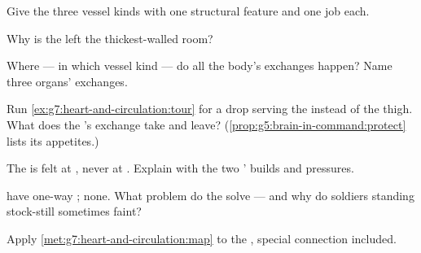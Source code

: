 \begin{exercise}[$\star$]\label{exo:g7:heart-and-circulation:4}
Give the three vessel kinds with one structural feature
and one job each.
\end{exercise}

\begin{exercise}[$\star$]\label{exo:g7:heart-and-circulation:5}
Why is the left  the thickest-walled room?
\end{exercise}

\begin{exercise}[$\star$]\label{exo:g7:heart-and-circulation:6}
Where --- in which vessel kind --- do all the body's
exchanges happen? Name three organs' 
exchanges.
\end{exercise}

\begin{exercise}[$\star\star$]\label{exo:g7:heart-and-circulation:7}
Run \cref{ex:g7:heart-and-circulation:tour} for a drop
serving the  instead of the thigh. What does the
's  exchange take and leave?
(\cref{prop:g5:brain-in-command:protect} lists its
appetites.)
\end{exercise}

\begin{exercise}[$\star\star$]\label{exo:g7:heart-and-circulation:8}
The  is felt at , never at . Explain
with the two ' builds and pressures.
\end{exercise}

\begin{exercise}[$\star\star$]\label{exo:g7:heart-and-circulation:9}
 have one-way ;  none. What problem
do the   solve --- and why do soldiers
standing stock-still sometimes faint?
\end{exercise}

\begin{exercise}[$\star\star$]\label{exo:g7:heart-and-circulation:10}
Apply \cref{met:g7:heart-and-circulation:map} to the
, special connection included.
\end{exercise}

